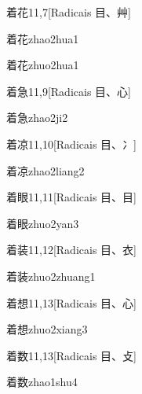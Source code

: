 \begin{entry}{着花}{11,7}[Radicais ⽬、⾋]
  \begin{phonetics}{着花}{zhao2hua1}
  \end{phonetics}
  \begin{phonetics}{着花}{zhuo2hua1}
  \end{phonetics}
\end{entry}

\begin{entry}{着急}{11,9}[Radicais ⽬、⼼]
  \begin{phonetics}{着急}{zhao2ji2}
  \end{phonetics}
\end{entry}

\begin{entry}{着凉}{11,10}[Radicais ⽬、⼎]
  \begin{phonetics}{着凉}{zhao2liang2}
  \end{phonetics}
\end{entry}

\begin{entry}{着眼}{11,11}[Radicais ⽬、⽬]
  \begin{phonetics}{着眼}{zhuo2yan3}
  \end{phonetics}
\end{entry}

\begin{entry}{着装}{11,12}[Radicais ⽬、⾐]
  \begin{phonetics}{着装}{zhuo2zhuang1}
  \end{phonetics}
\end{entry}

\begin{entry}{着想}{11,13}[Radicais ⽬、⼼]
  \begin{phonetics}{着想}{zhuo2xiang3}
  \end{phonetics}
\end{entry}

\begin{entry}{着数}{11,13}[Radicais ⽬、⽁]
  \begin{phonetics}{着数}{zhao1shu4}
  \end{phonetics}
\end{entry}

